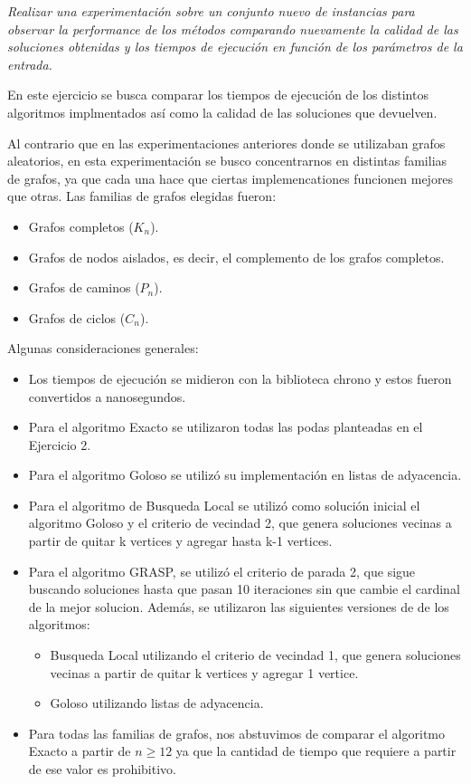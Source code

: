 \textit{Realizar una experimentación sobre un conjunto nuevo de instancias para observar la performance de los métodos comparando nuevamente la calidad de las soluciones obtenidas y los tiempos de ejecución en función de los parámetros de la entrada.}
\medskip

En este ejercicio se busca comparar los tiempos de ejecución de los distintos algoritmos implmentados así como la calidad de las soluciones que devuelven.

Al contrario que en las experimentaciones anteriores donde se utilizaban grafos aleatorios, en esta experimentación se busco concentrarnos en distintas familias de grafos, ya que cada una hace que ciertas implemencationes funcionen mejores que otras. Las familias de grafos elegidas fueron:
\begin{itemize}
    \item Grafos completos ($K_n$).
    \item Grafos de nodos aislados, es decir, el complemento de los grafos completos.
    \item Grafos de caminos ($P_n$).
    \item Grafos de ciclos ($C_n$).
\end{itemize}

Algunas consideraciones generales:
\begin{itemize}
    \item Los tiempos de ejecución se midieron con la biblioteca chrono y estos fueron convertidos a nanosegundos.
    \item Para el algoritmo Exacto se utilizaron todas las podas planteadas en el Ejercicio 2.
    \item Para el algoritmo Goloso se utilizó su implementación en listas de adyacencia.
    \item Para el algoritmo de Busqueda Local se utilizó como solución inicial el algoritmo Goloso y el criterio de vecindad 2, que genera soluciones vecinas a partir de quitar k vertices y agregar hasta k-1 vertices.
    \item Para el algoritmo GRASP, se utilizó el criterio de parada 2, que sigue buscando soluciones hasta que pasan 10 iteraciones sin que cambie el cardinal de la mejor solucion. Además, se utilizaron las siguientes versiones de de los algoritmos:
        \begin{itemize}
            \item Busqueda Local utilizando el criterio de vecindad 1, que genera soluciones vecinas a partir de quitar k vertices y agregar 1 vertice.
            \item Goloso utilizando listas de adyacencia.
        \end{itemize}
    \item Para todas las familias de grafos, nos abstuvimos de comparar el algoritmo Exacto a partir de $n \geq 12$ ya que la cantidad de tiempo que requiere a partir de ese valor es prohibitivo.
\end{itemize}

